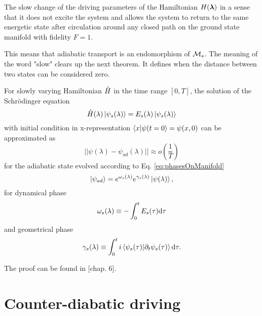 \begin{definition}[Adibaticity]
    The slow change of the driving parameters of the Hamiltonian $H({\bm\lambda})$ in a sense that it does not excite the system and allows the system to return to the same energetic state after circulation around any closed path on the ground state manifold with fidelity $F=1$. 
\end{definition}
This means that adiabatic transport is an endomorphism of $\mathcal{M} _s$. The meaning of the word "slow" clears up the next theorem. It defines when the distance between two states can be considered zero.
\begin{thm}
    \label{adiabaticTheorem}
    For slowly varying Hamiltonian $\hat{H}$ in the time range $[0,T]$, the solution of the Schrödinger equation 
    $$\hat{H}(\lambda)\ket{\psi_s(\lambda)} = E_s(\lambda)\ket{\psi_s(\lambda)}$$
    with initial condition in x-representation $\braket{x|\psi(t=0}=\psi(x,0)$ can be approximated as
    \begin{equation}
      ||\psi(\lambda) - \psi_{ad}(\lambda)||\approx o\left(\frac{1}{T}\right)
    \end{equation}
    for the adiabatic state evolved according to Eq. \ref{eq:phasesOnManifold}
    \begin{equation}
        \ket{\psi_{ad}}= e^{\omega_s(\lambda)}e^{\gamma_s(\lambda)}\ket{\psi(\lambda)},
    \end{equation}
    for dynamical phase
    $$\omega_s(\lambda)\equiv -\int_0^t E_s(\tau)\mathrm{d} \tau$$
    and geometrical phase
        $$\gamma_s(\lambda)\equiv \int_0^t i\braket{\psi_s(\tau)|\partial_t\psi_s(\tau)} \mathrm{d} \tau .$$
\end{thm}
\begin{myproof}
    The proof can be found in \citet{sakurai}[chap. 6].
\end{myproof}














\section{Counter-diabatic driving}


